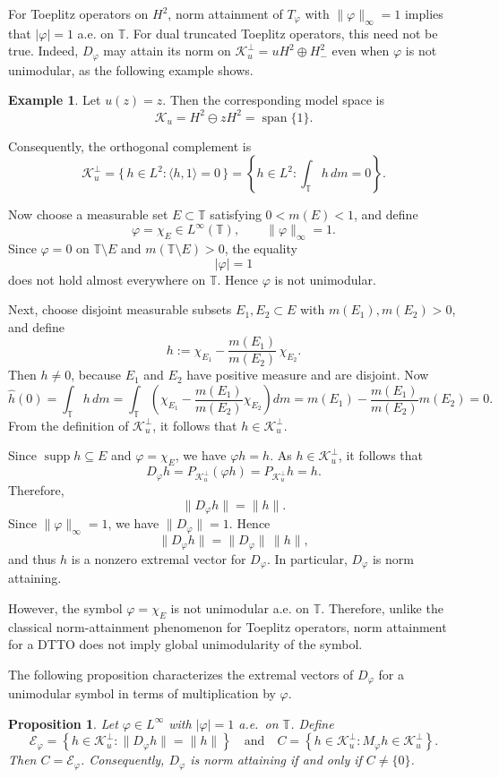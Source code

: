 \documentclass[12pt]{amsart}
\newtheorem{proposition}[theorem]{Proposition}
\theoremstyle{definition}
\newtheorem{example}[theorem]{Example}
\theoremstyle{remark}
\def \T{\mathbb{T}}
\newcommand{\cle}{\mathcal{E}}
\newcommand{\clk}{\mathcal{K}}
\newcommand{\vp}{\varphi}
\numberwithin{equation}{section}
\begin{document}
For Toeplitz operators on $H^2$, norm attainment of $T_\vp$ with
$\|\vp\|_\infty=1$ implies that $|\vp|=1$ a.e. on $\T$.
For dual truncated Toeplitz operators, this need not be true.
Indeed, $D_\vp$ may attain its norm on $\clk_u^\perp
=uH^2\oplus H^2_{-}$ even when $\vp$ is not unimodular, as the
following example shows.

\begin{example}
Let $u(z)=z$. Then the corresponding model space is
\[
\clk_u = H^2 \ominus zH^2 = \operatorname{span}\{1\}.
\]

Consequently, the orthogonal complement is
\[
\clk_u^\perp = \{\,h\in L^2: \langle h,1\rangle=0\,\}
 = \left\{h\in L^2: \int_{\T}h\,dm=0\right\}.
\]

Now choose a measurable set $E\subset\T$ satisfying $0<m(E)<1$, and define
\[
\vp = \chi_E \in L^\infty(\T), \qquad \|\vp\|_\infty = 1.
\]
Since $\vp=0$ on $\T\setminus E$ and
$m(\T\setminus E)>0$, the equality
\[
|\vp|=1
\]
does not hold almost everywhere on $\T$. Hence $\vp$ is not
unimodular.

Next, choose disjoint measurable subsets $E_1, E_2 \subset E$ with $m(E_1),m(E_2)>0$,
and define
\[
h := \chi_{E_1} - \frac{m(E_1)}{m(E_2)}\,\chi_{E_2}.
\]
Then $h\neq 0$, because $E_1$ and $E_2$ have positive measure and are disjoint.
Now 
\[
\widehat{h}(0) = \int_{\T} h\,dm
= \int_{\T}\left(\chi_{E_1} - \frac{m(E_1)}{m(E_2)}\chi_{E_2}\right)dm
= m(E_1) - \frac{m(E_1)}{m(E_2)}m(E_2) = 0.
\]
From the definition of $\clk_u^\perp$, it follows that $h\in \clk_u^\perp$.


Since $\operatorname{supp} h\subseteq E$ and $\vp=\chi_E$, we have
$\vp h=h$. As $h\in\clk_u^\perp$, it follows that
\[
D_\vp h =P_{\clk_u^\perp}(\vp h)
=P_{\clk_u^\perp}h=h.
\]
Therefore,
\[
\|D_\vp h\|=\|h\|.
\]
Since $\|\vp\|_\infty=1$, we have $\|D_\vp\|=1$. Hence
\[
\|D_\vp h\|=\|D_\vp\|\,\|h\|,
\]
and thus $h$ is a nonzero extremal vector for $D_\vp$. In particular,
$D_\vp$ is norm attaining.

However, the symbol $\vp=\chi_E$ is not unimodular a.e. on $\T$. Therefore, unlike the classical norm-attainment phenomenon for
Toeplitz operators, norm attainment for a DTTO does not imply
global unimodularity of the symbol.

\end{example}


The following proposition characterizes the extremal vectors of
$D_\vp$ for a unimodular symbol in terms of multiplication by $\vp$.

\begin{proposition}\label{prop:extremal-set}
Let $\vp\in L^\infty$ with $|\vp|=1$ a.e.\ on $\T$. Define
\[
\cle_\vp=
\left\{h\in\clk_u^\perp:\|D_\vp h\|=\|h\|\right\}
\quad\text{and}\quad
C=\left\{h\in\clk_u^\perp:M_\vp h\in\clk_u^\perp\right\}.
\]
Then $C=\cle_\vp$. Consequently, $D_\vp$ is norm attaining if and only if $C\neq\{0\}$.
\end{proposition}
\end{document}
